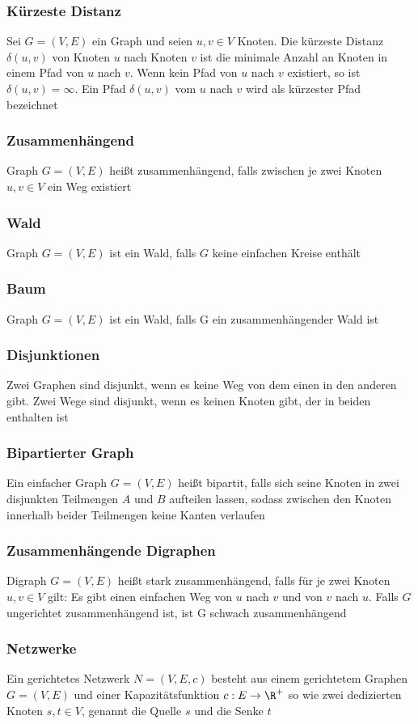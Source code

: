 	\subsubsection{Kürzeste Distanz}
		Sei $G=(V,E)$ ein Graph und seien $u,v\in V$ Knoten. Die kürzeste Distanz $\delta(u,v)$ von Knoten $u$ nach Knoten $v$ ist die minimale Anzahl an Knoten in einem Pfad von $u$ nach $v$. Wenn kein Pfad von $u$ nach $v$ existiert, so ist $\delta(u,v)=\infty$. Ein Pfad $\delta(u,v)$ vom $u$ nach $v$ wird als kürzester Pfad bezeichnet
	\subsubsection{Zusammenhängend}
		Graph $G=(V,E)$ heißt zusammenhängend, falls zwischen je zwei Knoten $u,v\in V$ ein Weg existiert
	\subsubsection{Wald}
		Graph $G=(V,E)$ ist ein Wald, falls $G$ keine einfachen Kreise enthält
	\subsubsection{Baum}
		Graph $G=(V,E)$ ist ein Wald, falls G ein zusammenhängender Wald ist
	\subsubsection{Disjunktionen}
		Zwei Graphen sind disjunkt, wenn es keine Weg von dem einen in den anderen gibt. Zwei Wege sind disjunkt, wenn es keinen Knoten gibt, der in beiden enthalten ist
	\subsubsection{Bipartierter Graph}
		Ein einfacher Graph $G=(V,E)$ heißt bipartit, falls sich seine Knoten in zwei disjunkten Teilmengen $A$ und $B$ aufteilen lassen, sodass zwischen den Knoten innerhalb beider Teilmengen keine Kanten verlaufen
	\subsubsection{Zusammenhängende Digraphen}
		Digraph $G=(V,E)$ heißt stark zusammenhängend, falls für je zwei Knoten $u,v\in V$ gilt: Es gibt einen einfachen Weg von $u$ nach $v$ und von $v$ nach $u$. Falls $G$ ungerichtet zusammenhängend ist, ist G schwach zusammenhängend
	\subsubsection{Netzwerke}
		Ein gerichtetes Netzwerk $N=(V,E,c)$ besteht aus einem gerichtetem Graphen $G=(V,E)$ und einer Kapazitätsfunktion $c:E\to \R^+$ so wie zwei dedizierten Knoten $s,t\in V$, genannt die Quelle $s$ und die Senke $t$
